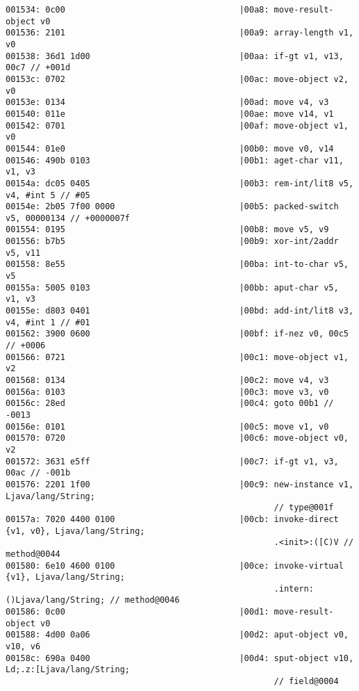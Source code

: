 \begin{lstlisting}
001534: 0c00                                   |00a8: move-result-object v0
001536: 2101                                   |00a9: array-length v1, v0
001538: 36d1 1d00                              |00aa: if-gt v1, v13, 00c7 // +001d
00153c: 0702                                   |00ac: move-object v2, v0
00153e: 0134                                   |00ad: move v4, v3
001540: 011e                                   |00ae: move v14, v1
001542: 0701                                   |00af: move-object v1, v0
001544: 01e0                                   |00b0: move v0, v14
001546: 490b 0103                              |00b1: aget-char v11, v1, v3
00154a: dc05 0405                              |00b3: rem-int/lit8 v5, v4, #int 5 // #05
00154e: 2b05 7f00 0000                         |00b5: packed-switch v5, 00000134 // +0000007f
001554: 0195                                   |00b8: move v5, v9
001556: b7b5                                   |00b9: xor-int/2addr v5, v11
001558: 8e55                                   |00ba: int-to-char v5, v5
00155a: 5005 0103                              |00bb: aput-char v5, v1, v3
00155e: d803 0401                              |00bd: add-int/lit8 v3, v4, #int 1 // #01
001562: 3900 0600                              |00bf: if-nez v0, 00c5 // +0006
001566: 0721                                   |00c1: move-object v1, v2
001568: 0134                                   |00c2: move v4, v3
00156a: 0103                                   |00c3: move v3, v0
00156c: 28ed                                   |00c4: goto 00b1 // -0013
00156e: 0101                                   |00c5: move v1, v0
001570: 0720                                   |00c6: move-object v0, v2
001572: 3631 e5ff                              |00c7: if-gt v1, v3, 00ac // -001b
001576: 2201 1f00                              |00c9: new-instance v1, Ljava/lang/String;
                                                      // type@001f
00157a: 7020 4400 0100                         |00cb: invoke-direct {v1, v0}, Ljava/lang/String;
                                                      .<init>:([C)V // method@0044
001580: 6e10 4600 0100                         |00ce: invoke-virtual {v1}, Ljava/lang/String;
                                                      .intern:()Ljava/lang/String; // method@0046
001586: 0c00                                   |00d1: move-result-object v0
001588: 4d00 0a06                              |00d2: aput-object v0, v10, v6
00158c: 690a 0400                              |00d4: sput-object v10, Ld;.z:[Ljava/lang/String;
                                                      // field@0004

\end{lstlisting}
